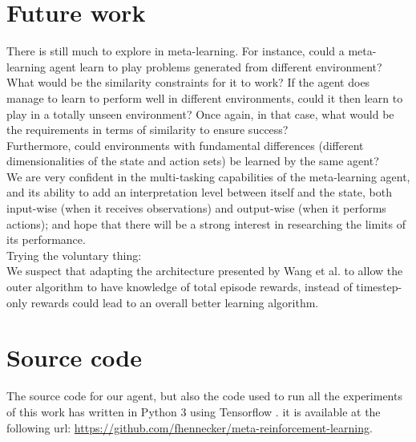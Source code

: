 \section{Future work}
There is still much to explore in meta-learning. For instance, could a 
meta-learning agent learn to play problems generated from different environment?
What would be the similarity constraints for it to work? If the agent does
manage to learn to perform well in different environments, could it then
learn to play in a totally unseen environment? Once again, in that case,
what would be the requirements in terms of similarity to ensure success?\\

Furthermore, could environments with fundamental differences (different 
dimensionalities of the state and action sets) be learned by the same agent?\\

We are very confident in the multi-tasking capabilities of the meta-learning
agent, and its ability to add an interpretation level between itself and the 
state, both input-wise (when it receives observations) and output-wise (when
it performs actions); and hope that there will be a strong interest in 
researching the limits of its performance.\\

Trying the voluntary thing:\\

We suspect that adapting the architecture presented by Wang et al. to allow
the outer algorithm to have knowledge of total episode rewards, instead of
timestep-only rewards could lead to an overall better learning algorithm.

\section{Source code}
The source code for our agent, but also the code used to run all the
experiments of this work has written in Python 3 \cite{python3} using
Tensorflow \cite{tensorflow}. it is available at the following url:
\url{https://github.com/fhennecker/meta-reinforcement-learning}.

